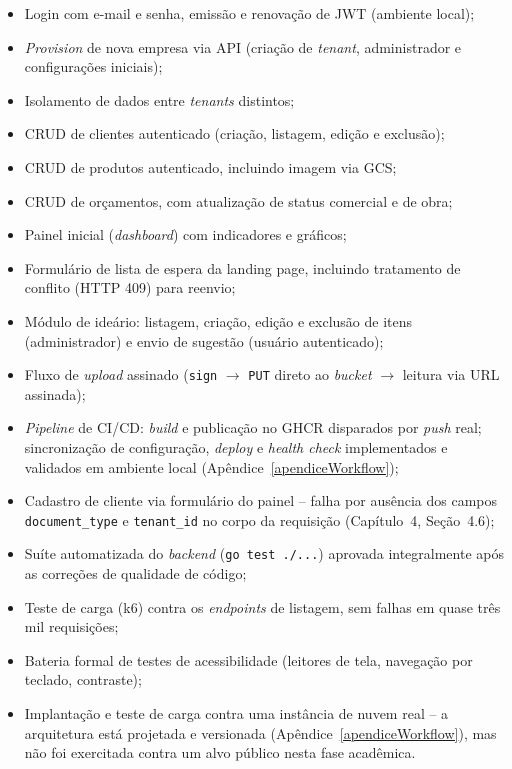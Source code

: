 \begin{itemize}
  \item[\textbf{[OK]}] Login com e-mail e senha, emissão e renovação de JWT (ambiente local);
  \item[\textbf{[OK]}] \textit{Provision} de nova empresa via API (criação de \textit{tenant}, administrador e configurações iniciais);
  \item[\textbf{[OK]}] Isolamento de dados entre \textit{tenants} distintos;
  \item[\textbf{[OK]}] CRUD de clientes autenticado (criação, listagem, edição e exclusão);
  \item[\textbf{[OK]}] CRUD de produtos autenticado, incluindo imagem via GCS;
  \item[\textbf{[OK]}] CRUD de orçamentos, com atualização de status comercial e de obra;
  \item[\textbf{[OK]}] Painel inicial (\textit{dashboard}) com indicadores e gráficos;
  \item[\textbf{[OK]}] Formulário de lista de espera da landing page, incluindo tratamento de conflito (HTTP 409) para reenvio;
  \item[\textbf{[OK]}] Módulo de ideário: listagem, criação, edição e exclusão de itens (administrador) e envio de sugestão (usuário autenticado);
  \item[\textbf{[OK]}] Fluxo de \textit{upload} assinado (\texttt{sign} $\rightarrow$ \texttt{PUT} direto ao \textit{bucket} $\rightarrow$ leitura via URL assinada);
  \item[\textbf{[OK]}] \textit{Pipeline} de CI/CD: \textit{build} e publicação no GHCR disparados por \textit{push} real; sincronização de configuração, \textit{deploy} e \textit{health check} implementados e validados em ambiente local (Apêndice~\ref{apendiceWorkflow});
  \item[\textbf{[BUG IDENTIFICADO]}] Cadastro de cliente via formulário do painel -- falha por ausência dos campos \texttt{document\_type} e \texttt{tenant\_id} no corpo da requisição (Capítulo~4, Seção~4.6);
  \item[\textbf{[OK]}] Suíte automatizada do \textit{backend} (\texttt{go test ./...}) aprovada integralmente após as correções de qualidade de código;
  \item[\textbf{[OK]}] Teste de carga (k6) contra os \textit{endpoints} de listagem, sem falhas em quase três mil requisições;
  \item[\textbf{[NÃO REALIZADO NESTA ETAPA]}] Bateria formal de testes de acessibilidade (leitores de tela, navegação por teclado, contraste);
  \item[\textbf{[NÃO REALIZADO NESTA ETAPA]}] Implantação e teste de carga contra uma instância de nuvem real -- a arquitetura está projetada e versionada (Apêndice~\ref{apendiceWorkflow}), mas não foi exercitada contra um alvo público nesta fase acadêmica.
\end{itemize}

